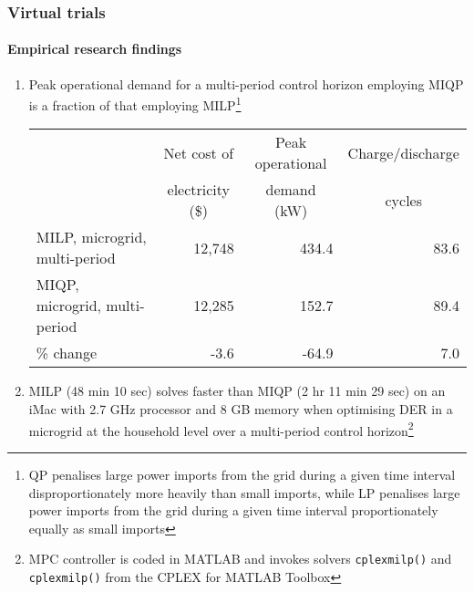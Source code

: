 \documentclass[handout, smaller, xcolor=table]{beamer}			%
\newcounter{enumcount}
\begin{document}
\begin{frame}
	\frametitle{Virtual trials}
	\framesubtitle{Empirical research findings}

	\begin{enumerate}
		\setcounter{enumi}{\value{enumcount}}
		\item  Peak operational demand for a multi-period control horizon employing MIQP is a fraction of that employing MILP\footnote{\scriptsize QP penalises large power imports from the grid during a given time interval disproportionately more heavily than small imports, while LP penalises large power imports from the grid during a given time interval proportionately equally as small imports
		}
			\begin{table}
			\centering
			{\scriptsize
			\begin{tabular}{l r r r}
				\toprule
				& \multicolumn{1}{c}{Net cost of}	& \multicolumn{1}{c}{Peak operational}	& \multicolumn{1}{c}{Charge/discharge}	\\
				& \multicolumn{1}{c}{	electricity (\$)} 	& \multicolumn{1}{c}{demand (kW)}		&\multicolumn{1}{c}{cycles}	\\
				\midrule
				MILP, microgrid, multi-period		& 12,748	& 434.4	& 83.6	\\
				MIQP, microgrid, multi-period		& 12,285	& 152.7	& 89.4	\\
				\midrule
				\% change	& -3.6		& -64.9		& 7.0		\\
				\bottomrule
			\end{tabular}
			}
			\end{table}
		
		\item  MILP (48 min 10 sec) solves faster than MIQP (2 hr 11 min 29 sec) on an iMac with 2.7 GHz processor and 8 GB memory when optimising DER in a microgrid at the household level over a multi-period control horizon\footnote{\scriptsize MPC controller is coded in \textsc{MATLAB} and invokes solvers \texttt{cplexmilp()} and \texttt{cplexmilp()} from the CPLEX for \textsc{MATLAB} Toolbox
		}
	
	\end{enumerate}

\end{frame}
\end{document}
